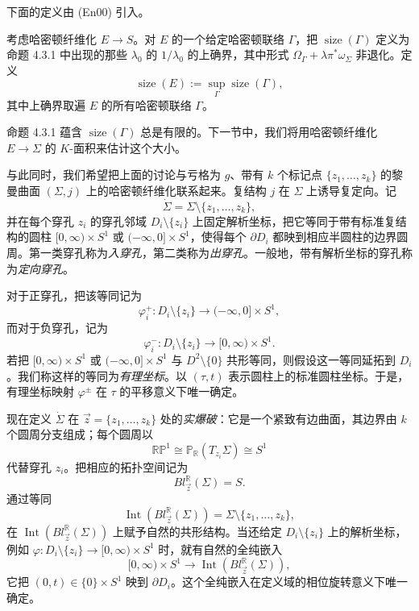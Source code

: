 下面的定义由 (En00) 引入。

\begin{definition}\label{def:size-hamiltonian-fibration}
考虑哈密顿纤维化 $E\to S$。对 $E$ 的一个给定哈密顿联络
$\Gamma$，把 $\operatorname{size}(\Gamma)$ 定义为命题
4.3.1 中出现的那些 $\lambda_0$ 的 $1/\lambda_0$ 的上确界，其中形式
$\Omega_\Gamma+\lambda\pi^*\omega_\Sigma$ 非退化。定义
\[
 \operatorname{size}(E):=\sup_\Gamma\operatorname{size}(\Gamma),
\]
其中上确界取遍 $E$ 的所有哈密顿联络 $\Gamma$。
\end{definition}

命题 4.3.1 蕴含 $\operatorname{size}(\Gamma)$ 总是有限的。下一节中，我们将用哈密顿纤维化 $E\to\Sigma$ 的 $K$-面积来估计这个大小。

与此同时，我们希望把上面的讨论与亏格为 $g$、带有 $k$ 个标记点
$\{z_1,\ldots,z_k\}$ 的黎曼曲面 $(\Sigma,j)$ 上的哈密顿纤维化联系起来。复结构 $j$ 在 $\Sigma$ 上诱导复定向。记
\[
 \dot\Sigma=\Sigma\setminus\{z_1,\ldots,z_k\},
\]
并在每个穿孔 $z_i$ 的穿孔邻域 $D_i\setminus\{z_i\}$ 上固定解析坐标，把它等同于带有标准复结构的圆柱
$[0,\infty)\times S^1$ 或 $(-\infty,0]\times S^1$，使得每个
$\partial D_i$ 都映到相应半圆柱的边界圆周。第一类穿孔称为\emph{入穿孔}，第二类称为\emph{出穿孔}。一般地，带有解析坐标的穿孔称为\emph{定向穿孔}。

对于正穿孔，把该等同记为
\[
 \varphi_i^+:D_i\setminus\{z_i\}\longrightarrow(-\infty,0]\times S^1,
\]
而对于负穿孔，记为
\[
 \varphi_i^-:D_i\setminus\{z_i\}\longrightarrow[0,\infty)\times S^1.
\]
若把 $[0,\infty)\times S^1$ 或 $(-\infty,0]\times S^1$ 与
$D^2\setminus\{0\}$ 共形等同，则假设这一等同延拓到 $D_i$。我们称这样的等同为\emph{有理坐标}。以 $(\tau,t)$ 表示圆柱上的标准圆柱坐标。于是，有理坐标映射 $\varphi^\pm$ 在 $\tau$ 的平移意义下唯一确定。

现在定义 $\dot\Sigma$ 在 $\vec z=\{z_1,\ldots,z_k\}$ 处的\emph{实爆破}：它是一个紧致有边曲面，其边界由 $k$ 个圆周分支组成；每个圆周以
\[
 \mathbb{RP}^1\cong\mathbb P_{\mathbb R}(T_{z_i}\Sigma)\cong S^1
\]
代替穿孔 $z_i$。把相应的拓扑空间记为
\[
 Bl_{\vec z}^{\mathbb R}(\Sigma)=S.
\]
通过等同
\[
 \operatorname{Int}(Bl_{\vec z}^{\mathbb R}(\Sigma))
 =\Sigma\setminus\{z_1,\ldots,z_k\},
\]
在 $\operatorname{Int}(Bl_{\vec z}^{\mathbb R}(\Sigma))$ 上赋予自然的共形结构。当还给定 $D_i\setminus\{z_i\}$ 上的解析坐标，例如
$\varphi:D_i\setminus\{z_i\}\to[0,\infty)\times S^1$ 时，就有自然的全纯嵌入
\[
 [0,\infty)\times S^1
 \longrightarrow\operatorname{Int}(Bl_{\vec z}^{\mathbb R}(\Sigma)),
\]
它把 $(0,t)\in\{0\}\times S^1$ 映到 $\partial D_i$。这个全纯嵌入在定义域的相位旋转意义下唯一确定。

